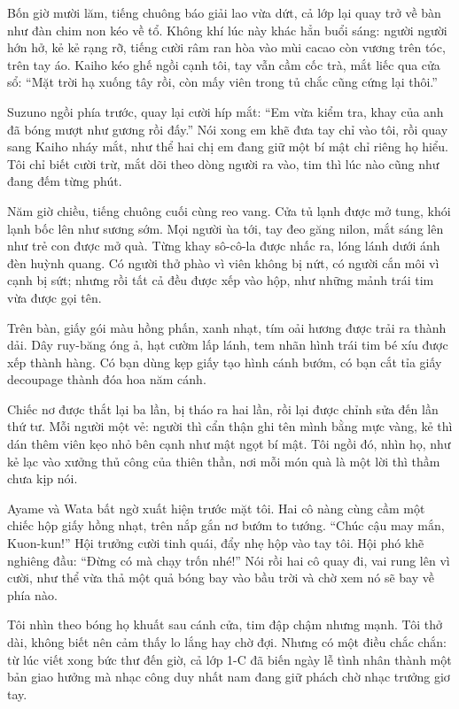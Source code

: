 \documentclass[../main.tex]{subfiles}
\begin{document}
Bốn giờ mười lăm, tiếng chuông báo giải lao vừa dứt, cả lớp lại quay trở về bàn như đàn chim non kéo về tổ. Không khí lúc này khác hẳn buổi sáng: người người hớn hở, kẻ kẻ rạng rỡ, tiếng cười râm ran hòa vào mùi cacao còn vương trên tóc, trên tay áo. Kaiho kéo ghế ngồi cạnh tôi, tay vẫn cầm cốc trà, mắt liếc qua cửa sổ: ``Mặt trời hạ xuống tây rồi, còn mấy viên trong tủ chắc cũng cứng lại thôi.''

Suzuno ngồi phía trước, quay lại cười híp mắt: ``Em vừa kiểm tra, khay của anh đã bóng mượt như gương rồi đấy.'' Nói xong em khẽ đưa tay chỉ vào tôi, rồi quay sang Kaiho nháy mắt, như thể hai chị em đang giữ một bí mật chỉ riêng họ hiểu. Tôi chỉ biết cười trừ, mắt dõi theo dòng người ra vào, tim thì lúc nào cũng như đang đếm từng phút.

Năm giờ chiều, tiếng chuông cuối cùng reo vang. Cửa tủ lạnh được mở tung, khói lạnh bốc lên như sương sớm. Mọi người ùa tới, tay đeo găng nilon, mắt sáng lên như trẻ con được mở quà. Từng khay sô-cô-la được nhấc ra, lóng lánh dưới ánh đèn huỳnh quang. Có người thở phào vì viên không bị nứt, có người cắn môi vì cạnh bị sứt; nhưng rồi tất cả đều được xếp vào hộp, như những mảnh trái tim vừa được gọi tên.

Trên bàn, giấy gói màu hồng phấn, xanh nhạt, tím oải hương được trải ra thành dải. Dây ruy-băng óng ả, hạt cườm lấp lánh, tem nhãn hình trái tim bé xíu được xếp thành hàng. Có bạn dùng kẹp giấy tạo hình cánh bướm, có bạn cắt tỉa giấy decoupage thành đóa hoa năm cánh.

Chiếc nơ được thắt lại ba lần, bị tháo ra hai lần, rồi lại được chỉnh sửa đến lần thứ tư. Mỗi người một vẻ: người thì cẩn thận ghi tên mình bằng mực vàng, kẻ thì dán thêm viên kẹo nhỏ bên cạnh như mật ngọt bí mật. Tôi ngồi đó, nhìn họ, như kẻ lạc vào xưởng thủ công của thiên thần, nơi mỗi món quà là một lời thì thầm chưa kịp nói.

Ayame và Wata bất ngờ xuất hiện trước mặt tôi. Hai cô nàng cùng cầm một chiếc hộp giấy hồng nhạt, trên nắp gắn nơ bướm to tướng. ``Chúc cậu may mắn, Kuon-kun!'' Hội trưởng cười tinh quái, đẩy nhẹ hộp vào tay tôi. Hội phó khẽ nghiêng đầu: ``Đừng có mà chạy trốn nhé!'' Nói rồi hai cô quay đi, vai rung lên vì cười, như thể vừa thả một quả bóng bay vào bầu trời và chờ xem nó sẽ bay về phía nào.

Tôi nhìn theo bóng họ khuất sau cánh cửa, tim đập chậm nhưng mạnh. Tôi thở dài, không biết nên cảm thấy lo lắng hay chờ đợi. Nhưng có một điều chắc chắn: từ lúc viết xong bức thư đến giờ, cả lớp 1-C đã biến ngày lễ tình nhân thành một bản giao hưởng mà nhạc công duy nhất nam đang giữ phách chờ nhạc trưởng giơ tay.
\end{document}
